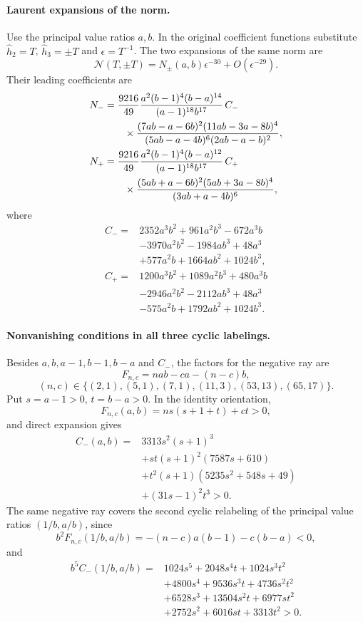 \documentclass[11pt,a4paper]{article}
\numberwithin{equation}{section}
\theoremstyle{plain}
\theoremstyle{definition}
\theoremstyle{remark}
\begin{document}
\paragraph{Laurent expansions of the norm.}
Use the principal value ratios $a,b$.  In the original
coefficient functions substitute $\widehat h_2 =T$, $\widehat h_3 =\pm T$ and
$\epsilon=T^{-1}$.  The two expansions of the same norm are
\begin{equation}\label{appr3tau:laurent}
 \mathcal N(T,\pm T)
   =N_\pm(a,b)\epsilon^{-30}+O(\epsilon^{-29}).
\end{equation}
Their leading coefficients are
\begin{align}
 N_-&=\frac{9216}{49}
 \frac{a^2(b-1)^4(b-a)^{14}}
      {(a-1)^{18}b^{17}}\,C_-\notag\\
 &\qquad\times
 \frac{(7ab-a-6b)^2(11ab-3a-8b)^4}
      {(5ab-a-4b)^6(2ab-a-b)^2},
 \label{appr3tau:negative}\\
 N_+&=\frac{9216}{49}
 \frac{a^2(b-1)^4(b-a)^{12}}
      {(a-1)^{18}b^{17}}\,C_+\notag\\
 &\qquad\times
 \frac{(5ab+a-6b)^2(5ab+3a-8b)^4}
      {(3ab+a-4b)^6},
 \label{appr3tau:positive}
\end{align}
where
\begin{align*}
 C_-={}&2352a^3b^2+961a^2b^3-672a^3b\\
       &-3970a^2b^2-1984ab^3+48a^3\\
       &+577a^2b+1664ab^2+1024b^3,\\
 C_+={}&1200a^3b^2+1089a^2b^3+480a^3b\\
       &-2946a^2b^2-2112ab^3+48a^3\\
       &-575a^2b+1792ab^2+1024b^3.
\end{align*}
\paragraph{Nonvanishing conditions in all three cyclic labelings.}
Besides $a,b,a-1,b-1,b-a$ and $C_-$, the factors for the negative ray
are
\[
 F_{n,c}=nab-ca-(n-c)b,
\]
\[
 (n,c)\in\{(2,1),(5,1),(7,1),(11,3),(53,13),(65,17)\}.
\]
Put $s=a-1>0$, $t=b-a>0$.  In the identity orientation,
\[
 F_{n,c}(a,b)=ns(s+1+t)+ct>0,
\]
and direct expansion gives
\begin{align*}
 C_-(a,b)={}&3313s^2(s+1)^3\\
 &+st(s+1)^2(7587s+610)\\
 &+t^2(s+1)(5235s^2+548s+49)\\
 &+(31s-1)^2t^3>0.
\end{align*}
The same negative ray covers the second cyclic relabeling of the principal value ratios
$(1/b,a/b)$, since
\[
 b^2F_{n,c}(1/b,a/b)
   =-(n-c)a(b-1)-c(b-a)<0,
\]
and
\begin{align*}
 b^5C_-(1/b,a/b)={}&1024s^5+2048s^4t+1024s^3t^2\\
 &+4800s^4+9536s^3t+4736s^2t^2\\
 &+6528s^3+13504s^2t+6977st^2\\
 &+2752s^2+6016st+3313t^2>0.
\end{align*}
\end{document}
